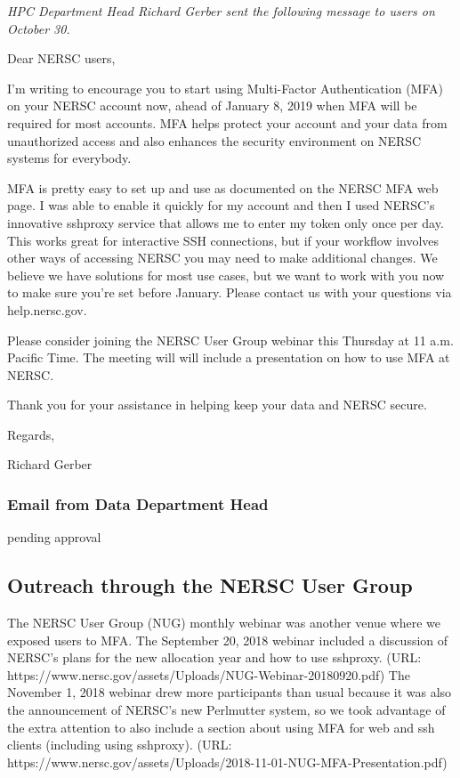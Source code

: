 \documentclass[sigconf,review]{acmart}
\begin{document}
\em{HPC Department Head Richard Gerber sent the following message to users on October 30.}

Dear NERSC users,

I’m writing to encourage you to start using Multi-Factor Authentication (MFA) on your NERSC account now, ahead of January 8, 2019 when MFA will be required for most accounts. MFA helps protect your account and your data from unauthorized access and also enhances the security environment on NERSC systems for everybody. 

MFA is pretty easy to set up and use as documented on the NERSC MFA web page. I was able to enable it quickly for my account and then I used NERSC’s innovative sshproxy service that allows me to enter my token only once per day. This works great for interactive SSH connections, but if your workflow involves other ways of accessing NERSC you may need to make additional changes. We believe we have solutions for most use cases, but we want to work with you now to make sure you’re set before January. Please contact us with your questions via help.nersc.gov. 

Please consider joining the NERSC User Group webinar this Thursday at 11 a.m. Pacific Time. The meeting will will include a presentation on how to use MFA at NERSC.  

Thank you for your assistance in helping keep your data and NERSC secure.


Regards,

Richard Gerber

\subsubsection{Email from Data Department Head}
pending approval

\subsection{Outreach through the NERSC User Group}

The NERSC User Group (NUG) monthly webinar was another venue where we exposed users to MFA.
The September 20, 2018 webinar included a discussion of NERSC's plans for the new allocation year and how to use sshproxy. (URL: https://www.nersc.gov/assets/Uploads/NUG-Webinar-20180920.pdf)
The November 1, 2018 webinar drew more participants than usual because it was also the announcement of NERSC's new Perlmutter system, so we took advantage of the extra attention to also include a section about using MFA for web and ssh clients (including using sshproxy). (URL: https://www.nersc.gov/assets/Uploads/2018-11-01-NUG-MFA-Presentation.pdf)
\end{document}
